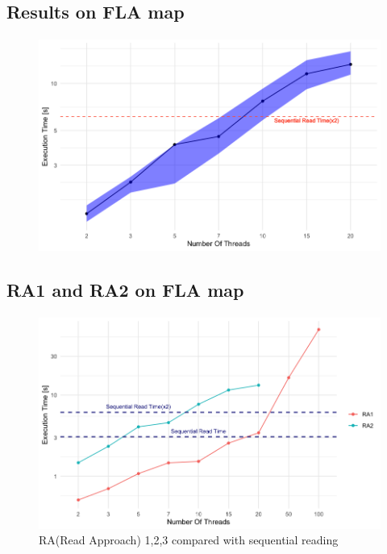\documentclass[12pt]{beamer}
\begin{document}
	\subsection{Results on FLA map}
	\begin{frame}{\secname}
		\framesubtitle{\subsecname}
		\begin{figure}[ht!]
			\centering
			\includegraphics[width=0.8\linewidth]{read/par_read_2_time.png}
			\label{parread2time}
		  \end{figure}
	\end{frame}
	\subsection{RA1 and RA2 on FLA map}
	\begin{frame}{\secname}
		\framesubtitle{\subsecname}
		\begin{figure}[ht!]
			\centering
			\includegraphics[width=1\linewidth]{read/par_read_all_time.png}
			\caption{RA(Read Approach) 1,2,3 compared with sequential reading}
			\label{parreadalltime}
		\end{figure}
	\end{frame}
\end{document}

